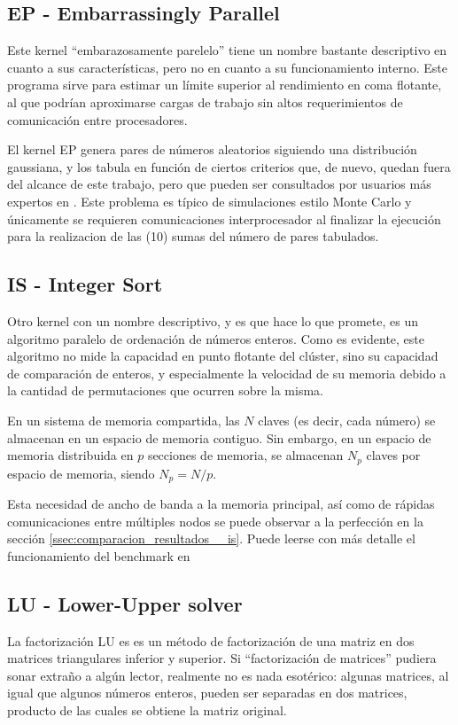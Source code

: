 \subsection{EP - Embarrassingly Parallel}
\label{sssec:benchmarks__ep}
Este kernel ``embarazosamente parelelo'' tiene un nombre bastante descriptivo en cuanto a sus características, pero no en cuanto a su funcionamiento interno. Este programa sirve para estimar un límite superior al rendimiento en coma flotante, al que podrían aproximarse cargas de trabajo sin altos requerimientos de comunicación entre procesadores.

El kernel EP genera pares de números aleatorios siguiendo una distribución gaussiana, y los tabula en función de ciertos criterios que, de nuevo, quedan fuera del alcance de este trabajo, pero que pueden ser consultados por usuarios más expertos en \cite[2.2.1]{benchmarks1994technical}. Este problema es típico de simulaciones estilo Monte Carlo y únicamente se requieren comunicaciones interprocesador al finalizar la ejecución para la realizacion de las (10) sumas del número de pares tabulados. 

\subsection{IS - Integer Sort}
\label{sssec:benchmarks__is}
Otro kernel con un nombre descriptivo, y es que hace lo que promete, es un algoritmo paralelo de ordenación de números enteros. Como es evidente, este algoritmo no mide la capacidad en punto flotante del clúster, sino su capacidad de comparación de enteros, y especialmente la velocidad de su memoria debido a la cantidad de permutaciones que ocurren sobre la misma.

En un sistema de memoria compartida, las $N$ claves (es decir, cada número) se almacenan en un espacio de memoria contiguo. Sin embargo, en un espacio de memoria distribuida en $p$ secciones de memoria, se almacenan $N_{p}$ claves por espacio de memoria, siendo $N_{p} = N / p$.

Esta necesidad de ancho de banda a la memoria principal, así como de rápidas comunicaciones entre múltiples nodos se puede observar a la perfección en la sección \ref{ssec:comparacion_resultados__is}. Puede leerse con más detalle el funcionamiento del benchmark en \cite[2.2.5]{benchmarks1994technical}

\subsection{LU - Lower-Upper solver}
\label{sssec:benchmarks__lu}
La factorización LU es es un método de factorización de una matriz en dos matrices triangulares inferior y superior. Si ``factorización de matrices'' pudiera sonar extraño a algún lector, realmente no es nada esotérico: algunas matrices, al igual que algunos números enteros, pueden ser separadas en dos matrices, producto de las cuales se obtiene la matriz original.

